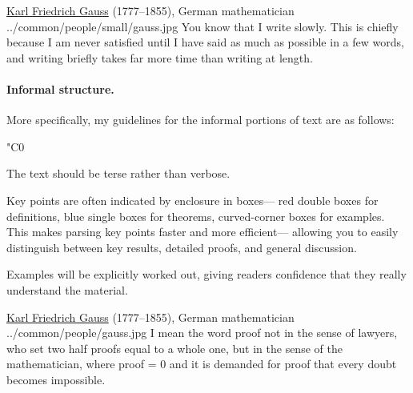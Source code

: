 \qboxnps
  {
    \href{http://en.wikipedia.org/wiki/Carl_Friedrich_Gauss}{Karl Friedrich Gauss}
    (1777--1855), German mathematician
    \footnotemark
  }
  {../common/people/small/gauss.jpg}
  {You know that I write slowly.
    This is chiefly because I am never satisfied until I have said as much as
    possible in a few words,
    and writing briefly takes far more time than writing at length.}


  \paragraph{Informal structure.}
  More specifically, my guidelines for the informal portions of text are as follows:
  \begin{dingautolist}{"C0}
    \item The text should be terse rather than verbose.
    \item Key points are often indicated by enclosure in boxes---
          red double boxes for definitions, blue single boxes for theorems,
          curved-corner boxes for examples.
          This makes parsing key points faster and more efficient---
          allowing you to easily distinguish between key results, detailed proofs,
          and general discussion.
    \item Examples will be explicitly worked out, giving readers
          confidence that they really understand the material.
  \end{dingautolist}


\qboxnps
  {
    \href{http://en.wikipedia.org/wiki/Carl_Friedrich_Gauss}{Karl Friedrich Gauss}
    (1777--1855), German mathematician
    \footnotemark
  }
  {../common/people/gauss.jpg}
  {I mean the word proof not in the sense of lawyers,
    who set two half proofs equal to a whole one,
    but in the sense of the mathematician, where \textonehalf proof = 0
    and it is demanded for proof that every doubt becomes impossible.}

